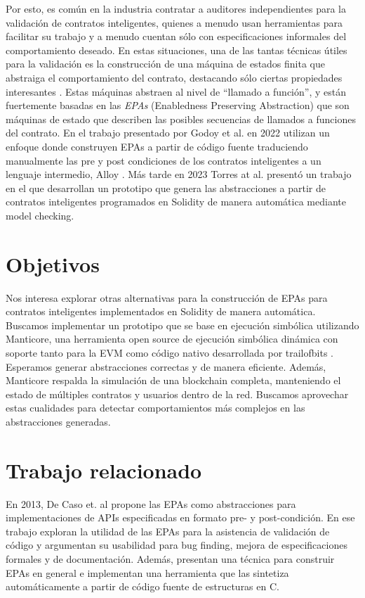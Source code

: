 Por esto, es común en la industria contratar a auditores independientes para la validación de contratos inteligentes,
quienes a menudo usan herramientas para facilitar su trabajo y a menudo cuentan sólo con especificaciones informales del comportamiento deseado.
En estas situaciones, una de las tantas técnicas útiles para la validación es  la construcción de una máquina de estados finita que abstraiga el comportamiento del contrato, destacando sólo ciertas propiedades interesantes \cite{predicate-abstraction-for-smart-contract-validation}.
Estas máquinas abstraen al nivel de ``llamado a función'', y están fuertemente basadas en las \textit{EPAs} (Enabledness Preserving Abstraction) \cite{de-caso-epa} que son máquinas de estado que describen las posibles secuencias de llamados a funciones del contrato.
En el trabajo presentado por Godoy et al. en 2022 \cite{predicate-abstraction-for-smart-contract-validation} utilizan un enfoque donde construyen EPAs a partir de código fuente traduciendo manualmente las pre y post condiciones de los contratos inteligentes a un lenguaje intermedio, Alloy \cite{alloy}.
Más tarde en 2023 Torres at al. \cite{torres} presentó un trabajo en el que desarrollan un prototipo que genera las abstracciones a partir de contratos inteligentes programados en Solidity de manera automática mediante model checking.

\section{Objetivos}

Nos interesa explorar otras alternativas para la construcción de EPAs para contratos inteligentes implementados en Solidity de manera automática.
Buscamos implementar un prototipo que se base en ejecución simbólica utilizando Manticore, una herramienta open source de ejecución simbólica dinámica con soporte tanto para la EVM como código nativo desarrollada por trailofbits \cite{manticore}.
Esperamos generar abstracciones correctas y de manera eficiente.
Además, Manticore respalda la simulación de una blockchain completa, manteniendo el estado de múltiples contratos y usuarios dentro de la red.
Buscamos aprovechar estas cualidades para detectar comportamientos más complejos en las abstracciones generadas.

\section{Trabajo relacionado}
En 2013, De Caso et. al \cite{de-caso-epa} propone las EPAs como abstracciones para implementaciones de APIs especificadas en formato pre- y post-condición.
En ese trabajo exploran la utilidad de las EPAs para la asistencia de validación de código y argumentan su usabilidad para bug finding, mejora de especificaciones formales y de documentación.
Además, presentan una técnica para construir EPAs en general e implementan una herramienta que las sintetiza automáticamente a partir de código fuente de estructuras en C.

